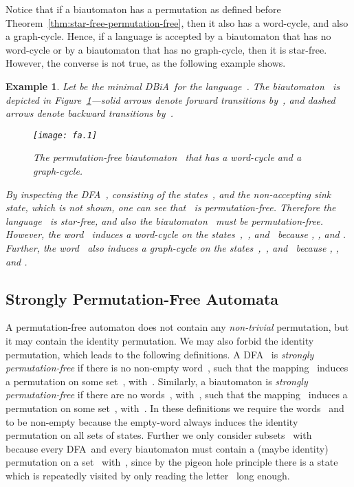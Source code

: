 \documentclass[submission]{eptcs}
\newcommand{\dfa}{\textrm{DFA}}
\newcommand{\dbia}{\textrm{DBiA}}
\newtheorem{example}[theorem]{Example}
\begin{document}
Notice that if a biautomaton has a permutation as defined before
Theorem~\ref{thm:star-free-permutation-free}, then it also has a
word-cycle, and also a graph-cycle.  Hence, if a language is accepted
by a biautomaton that has no word-cycle or by a biautomaton that has
no graph-cycle, then it is star-free.  However, the converse is not
true, as the following example shows.

\begin{example}
  Let  be the \emph{minimal} \dbia\ for the
  language~.  The biautomaton~ is depicted in
  Figure~\ref{fig:permutation-free-with-word-graph-cycle}---solid
  arrows denote forward transitions by~, and dashed arrows
  denote backward transitions by~.
\begin{figure}
    \centering
    \texttt{[image: fa.1]}
    \caption{The permutation-free biautomaton~ that has a
      word-cycle and a graph-cycle.}
    \label{fig:permutation-free-with-word-graph-cycle}
  \end{figure}
By inspecting the \dfa~, consisting of the
  states~, and the non-accepting sink state, which is not
  shown, one can see that~ is permutation-free.  Therefore the
  language~ is star-free, and also the biautomaton~ must be
  permutation-free.  However, the word~ induces a word-cycle on
  the states~,~, and~ because ,
  , and .  Further, the
  word~ also induces a graph-cycle on the states~,~,
  and~ because , , and .
\end{example}

\subsection{Strongly Permutation-Free Automata}
\label{sec:strongly-perm-free}

A permutation-free automaton does not contain any \emph{non-trivial}
permutation, but it may contain the identity permutation.  We may also
forbid the identity permutation, which leads to the following
definitions.
A \dfa~ is \emph{strongly permutation-free}
if there is no non-empty word~, such that the
mapping~ induces a permutation on some
set~, with~.
Similarly, a biautomaton  is
\emph{strongly permutation-free} if there are no
words~, with~, such that the
mapping~ induces a permutation on some
set~, with~.
In these definitions we require the words~ and~ to be non-empty
because the empty-word always induces the identity permutation on all
sets of states.  Further we only consider subsets~
with~ because every \dfa\ and every biautomaton must
contain a (maybe identity) permutation on a set~
with~, since by the pigeon hole principle there is a
state which is repeatedly visited by only reading the letter~ long
enough.
\end{document}
